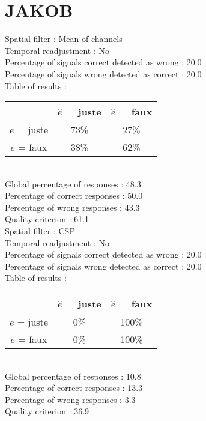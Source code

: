 \section*{JAKOB}
Spatial filter : Mean of channels \\
Temporal readjustment : No \\
Percentage of signals correct detected as wrong :   20.0 \\
Percentage of signals wrong detected as correct :   20.0 \\
Table of results : \\
\begin{tabular}{|c|c|c|}
\hline				& $\hat{e}$ = juste & $\hat{e}$ = faux \\
\hline  $e$ = juste	&     73\%			&     27\%		\\
\hline  $e$ = faux	&     38\%			&     62\%		\\
\hline
\end{tabular}\\
Global percentage of responses :   48.3 \\
Percentage of correct responses :   50.0 \\
Percentage of wrong responses :   43.3 \\
Quality criterion :   61.1 \\

Spatial filter : CSP \\
Temporal readjustment : No \\
Percentage of signals correct detected as wrong :   20.0 \\
Percentage of signals wrong detected as correct :   20.0 \\
Table of results : \\
\begin{tabular}{|c|c|c|}
\hline				& $\hat{e}$ = juste & $\hat{e}$ = faux \\
\hline  $e$ = juste	&      0\%			&    100\%		\\
\hline  $e$ = faux	&      0\%			&    100\%		\\
\hline
\end{tabular}\\
Global percentage of responses :   10.8 \\
Percentage of correct responses :   13.3 \\
Percentage of wrong responses :    3.3 \\
Quality criterion :   36.9 \\

